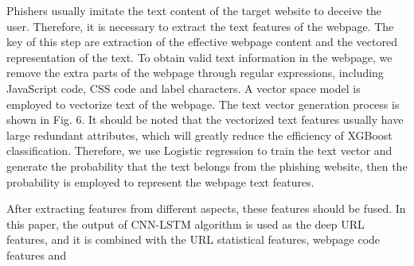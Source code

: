 \documentclass{ieeeaccess}
\begin{document}
\par Phishers usually imitate the text content of the target website
to deceive the user. Therefore, it is necessary to extract
the text features of the webpage. The key of this step are
extraction of the effective webpage content and the vectored
representation of the text. To obtain valid text information
in the webpage, we remove the extra parts of the webpage
through regular expressions, including JavaScript code, CSS
code and label characters. A vector space model is employed
to vectorize text of the webpage. The text vector generation
process is shown in Fig. 6. It should be noted that the vectorized
text features usually have large redundant attributes,
which will greatly reduce the efficiency of XGBoost classification. Therefore, we use Logistic regression to train the text vector and generate the probability that the text belongs from the phishing website, then the probability is employed
to represent the webpage text features.
\par After extracting features from different aspects, these features
should be fused. In this paper, the output of CNN-LSTM
algorithm is used as the deep URL features, and it is combined
with the URL statistical features, webpage code features and
\end{document}
